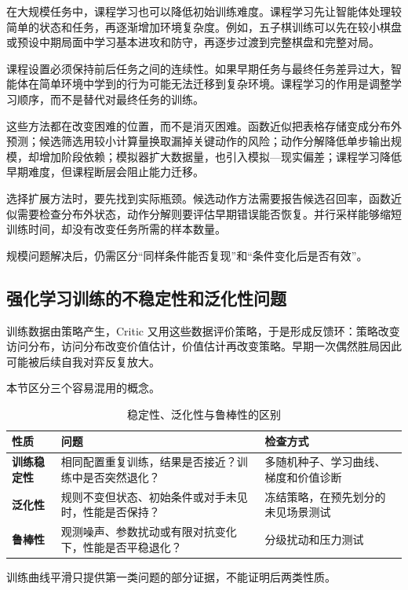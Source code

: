在大规模任务中，课程学习也可以降低初始训练难度。课程学习先让智能体处理较简单的状态和任务，再逐渐增加环境复杂度。例如，五子棋训练可以先在较小棋盘或预设中期局面中学习基本进攻和防守，再逐步过渡到完整棋盘和完整对局。

课程设置必须保持前后任务之间的连续性。如果早期任务与最终任务差异过大，智能体在简单环境中学到的行为可能无法迁移到复杂环境。课程学习的作用是调整学习顺序，而不是替代对最终任务的训练。

这些方法都在改变困难的位置，而不是消灭困难。函数近似把表格存储变成分布外预测；候选筛选用较小计算量换取漏掉关键动作的风险；动作分解降低单步输出规模，却增加阶段依赖；模拟器扩大数据量，也引入模拟—现实偏差；课程学习降低早期难度，但课程断层会阻止能力迁移。

选择扩展方法时，要先找到实际瓶颈。候选动作方法需要报告候选召回率，函数近似需要检查分布外状态，动作分解则要评估早期错误能否恢复。并行采样能够缩短训练时间，却没有改变任务所需的样本数量。

规模问题解决后，仍需区分“同样条件能否复现”和“条件变化后是否有效”。

\subsection{强化学习训练的不稳定性和泛化性问题}

训练数据由策略产生，Critic 又用这些数据评价策略，于是形成反馈环：策略改变访问分布，访问分布改变价值估计，价值估计再改变策略。早期一次偶然胜局因此可能被后续自我对弈反复放大。

本节区分三个容易混用的概念。

\begin{table}[htbp]
  \centering
  \caption{稳定性、泛化性与鲁棒性的区别}
  \label{tab:stability-generalization-robustness}
  \begin{tabularx}{\linewidth}{>{\bfseries}p{2.5cm}p{4.2cm}X}
    \toprule
    性质 & 问题 & 检查方式 \\
    \midrule
    训练稳定性 & 相同配置重复训练，结果是否接近？训练中是否突然退化？ & 多随机种子、学习曲线、梯度和价值诊断 \\
    泛化性 & 规则不变但状态、初始条件或对手未见时，性能是否保持？ & 冻结策略，在预先划分的未见场景测试 \\
    鲁棒性 & 观测噪声、参数扰动或有限对抗变化下，性能是否平稳退化？ & 分级扰动和压力测试 \\
    \bottomrule
  \end{tabularx}
\end{table}

训练曲线平滑只提供第一类问题的部分证据，不能证明后两类性质。


